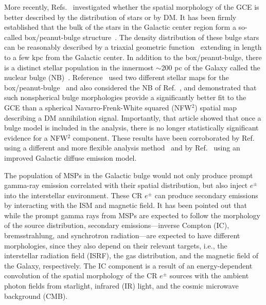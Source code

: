 \documentclass[doublespace,nopageskip]{VTthesis} %
\begin{document}
More recently, Refs.~\cite{Macias:2016nev, Bartels:2017vsx,  Macias:2019omb} investigated whether the spatial morphology of the GCE is better described by the distribution of stars or by DM. It has been firmly established that the bulk of the stars in the Galactic center region form a so-called box/peanut-bulge structure~\cite{Dwek:1995xu,Freudenreich:1997bx,LopezCorredoira:1999dg,Nataf:2010wf,Wegg:2013upa}. The density distribution of these bulge stars can be reasonably described by a triaxial geometric function~\cite{Freudenreich:1997bx,Nataf:2010wf,Wegg:2013upa} extending in length to a few kpc from the Galactic center. In addition to the box/peanut-bulge, there is a distinct stellar population in the innermost $\sim$200 pc of the Galaxy called the nuclear bulge (NB)~\cite{Nishiyama:2013eba}. Reference~\cite{Macias:2016nev} used two different stellar maps for the box/peanut-bulge~\cite{Freudenreich:1997bx,Ness:2016aaa} and also considered the NB of Ref.~\cite{Nishiyama:2013eba}, and demonstrated that such nonspherical bulge morphologies provide a significantly better fit to the GCE than a spherical Navarro-Frenk-White squared (NFW$^2$) spatial map describing a DM annihilation signal. Importantly, that article showed that once a bulge model is included in the analysis, there is no longer statistically significant evidence for a NFW$^2$ component. These results have been corroborated by Ref.\cite{Bartels:2017vsx} using a different and more flexible analysis method~\cite{Storm:2017arh} and by Ref.~\cite{Macias:2019omb} using an improved Galactic diffuse emission model.

The population of MSPs in the Galactic bulge would not only produce prompt gamma-ray emission correlated with their spatial distribution, but also inject $e^\pm$ into the interstellar environment. These CR $e^\pm$ can produce secondary emissions by interacting with the ISM and magnetic field. It has been pointed out that while the prompt gamma rays from MSPs are expected to follow the morphology of the source distribution, secondary emissions---inverse Compton (IC), bremsstrahlung, and synchrotron radiation---are expected to have different morphologies, since they also depend on their relevant targets, i.e., the interstellar radiation field (ISRF), the gas distribution, and the magnetic field of the Galaxy, respectively. The IC component is a result of an energy-dependent convolution of the spatial morphology of the CR $e^\pm$ sources with the ambient photon fields from starlight, infrared (IR) light, and the cosmic microwave background (CMB).
\end{document}
